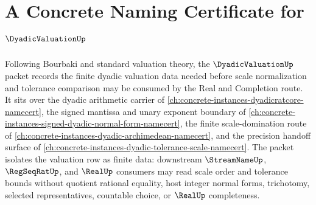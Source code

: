 \chapter{A Concrete Naming Certificate for $\DyadicValuationUp$}
\label{ch:concrete-instances-dyadic-valuation-namecert}

Following Bourbaki and standard valuation theory, the $\DyadicValuationUp$ packet records the finite dyadic valuation data needed before scale normalization and tolerance comparison may be consumed by the Real and Completion route. It sits over the dyadic arithmetic carrier of \autoref{ch:concrete-instances-dyadicratcore-namecert}, the signed mantissa and unary exponent boundary of \autoref{ch:concrete-instances-signed-dyadic-normal-form-namecert}, the finite scale-domination route of \autoref{ch:concrete-instances-dyadic-archimedean-namecert}, and the precision handoff surface of \autoref{ch:concrete-instances-dyadic-tolerance-scale-namecert}. The packet isolates the valuation row as finite data: downstream $\StreamNameUp$, $\RegSeqRatUp$, and $\RealUp$ consumers may read scale order and tolerance bounds without quotient rational equality, host integer normal forms, trichotomy, selected representatives, countable choice, or $\RealUp$ completeness.

